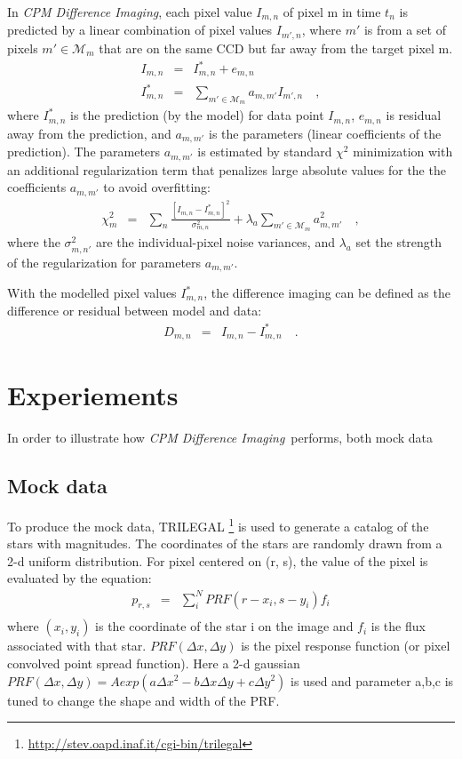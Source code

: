 \documentclass[12pt, preprint]{aastex}
\newcommand{\project}[1]{\textsl{#1}}
\newcommand{\cpmdiff}{\project{CPM Difference Imaging}}
\newcommand{\set}[1]{\mathcal{#1}}
\begin{document}
In \cpmdiff, each pixel value $I_{m,n}$ of pixel m in time $t_n$ is predicted by a linear combination of pixel values $I_{m',n}$, where $m'$ is from a set of pixels $m'\in\set{M}_m$ that are on the same CCD but far away from the target pixel m.
\begin{eqnarray}
I_{m,n}         &=& I^{\ast}_{m,n} + e_{m,n}
\\
I^{\ast}_{m,n}  &=& \sum_{m'\in\set{M}_m} a_{m,m'}I_{m',n} 
\quad,
\end{eqnarray}
where $I^{\ast}_{m,n}$ is the prediction (by the model) for data point $I_{m,n}$, $e_{m,n}$ is residual away from the prediction, and $a_{m,m'}$ is the parameters (linear coefficients of the prediction).
The parameters $a_{m,m'}$ is estimated by standard $\chi^2$ minimization with an additional regularization term that penalizes large absolute values for the the coefficients $a_{m,m'}$ to avoid overfitting:
\begin{eqnarray}
\chi^2_{m}    &=& \sum_{n} \frac{[I_{m,n} - I^{\ast}_{m,n}]^2}{\sigma^2_{m,n}}+ \lambda_{a}\sum_{m'\in\set{M}_m}a_{m,m'}^2 
\quad,
\end{eqnarray}
where the $\sigma^2_{m,n'}$ are the individual-pixel noise variances, and $\lambda_{a}$ set the strength of the regularization for parameters $a_{m,m'}$.

With the modelled pixel values $I^{\ast}_{m,n}$, the difference imaging can be defined as the difference or residual between model and data:
\begin{eqnarray}
D_{m,n} &=& I_{m,n} - I^{\ast}_{m,n}
\quad.
\end{eqnarray}

\section{Experiements}

In order to illustrate how \cpmdiff\ performs, both mock data
 


\subsection{Mock data}
To produce the mock data, TRILEGAL \footnote{\url{http://stev.oapd.inaf.it/cgi-bin/trilegal}} is used to generate a catalog of the stars with magnitudes. 
The coordinates of the stars are randomly drawn from a 2-d uniform distribution. 
For pixel centered on (r, s), the value of the pixel is evaluated by the equation:
\begin{eqnarray}
p_{r,s} &=& \sum_{i}^{N} PRF(r-x_i, s-y_i) f_i\\
\end{eqnarray}
where $(x_i,y_i)$ is the coordinate of the star i on the image and $f_i$ is the flux associated with that star. 
$PRF(\Delta x, \Delta y)$ is the pixel response function (or pixel convolved point spread function). 
Here a 2-d gaussian $PRF(\Delta x, \Delta y) = A exp(a\Delta x^2-b\Delta x \Delta y+c\Delta y^2)$ is used and parameter a,b,c is tuned to change the shape and width of the PRF.
\end{document}
